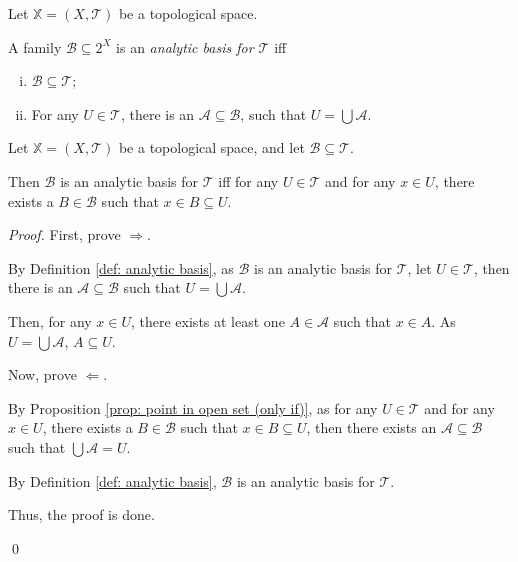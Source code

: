 \begin{definition}
	\label{def: analytic basis}
	Let $\mathbb X = (X, \mathcal T)$ be a topological space.
	
	A family $\mathcal B \subseteq 2^X$ is an \textit{analytic basis for $\mathcal T$} iff
	\begin{enumerate}[(i)]
		\item $\mathcal B \subseteq \mathcal T$;
		\item For any $U \in \mathcal T$, there is an $\mathcal A \subseteq \mathcal B$, such that $U = \bigcup \mathcal A$.
	\end{enumerate}
\end{definition}


\begin{proposition}
	\label{prop: alternative definition of analytic basis}
	Let $\mathbb X = (X, \mathcal T)$ be a topological space, and let $\mathcal B \subseteq \mathcal T$.
	
	Then $\mathcal B$ is an analytic basis for $\mathcal T$ iff for any $U \in \mathcal T$ and for any $x \in U$, there exists a $B \in \mathcal B$ such that $x \in B \subseteq U$.
	
	\begin{proof}
		First, prove $\Rightarrow$.
		
		By Definition \ref{def: analytic basis}, as $\mathcal B$ is an analytic basis for $\mathcal T$, let $U \in \mathcal T$, then there is an $\mathcal A \subseteq \mathcal B$ such that $U = \bigcup \mathcal A$.
		
		Then, for any $x \in U$, there exists at least one $A \in \mathcal A$ such that $x \in A$. As $U = \bigcup\mathcal A$, $A \subseteq U$.
		
		\qedlm
		
		Now, prove $\Leftarrow$.
		
		By Proposition \ref{prop: point in open set (only if)}, as for any $U \in \mathcal T$ and for any $x \in U$, there exists a $B \in \mathcal B$ such that $x \in B \subseteq U$, then there exists an $\mathcal A \subseteq \mathcal B$ such that $\bigcup \mathcal A = U$.
		
		By Definition \ref{def: analytic basis}, $\mathcal B$ is an analytic basis for $\mathcal T$.
		
		\qedlm
		
		Thus, the proof is done.
		
		\qed
	\end{proof}
\end{proposition}


